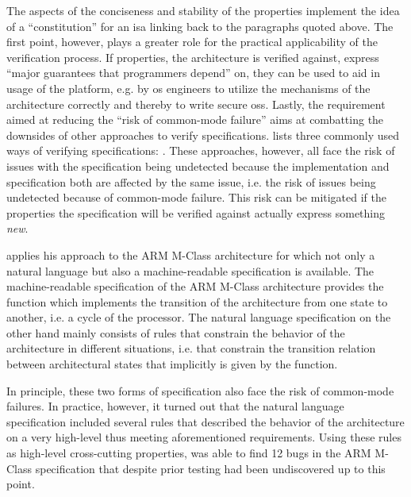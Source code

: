 The aspects of the conciseness and stability of the properties implement the idea of a \enquote{constitution} for an \gls{isa} linking back to the paragraphs quoted above.
The first point, however, plays a greater role for the practical applicability of the verification process.
If properties, the architecture is verified against, express \enquote{major guarantees that programmers  depend} on, they can be used to aid in usage of the platform, e.g. by \gls{os} engineers to utilize the mechanisms of the architecture correctly and thereby to write secure \glspl{os}.
Lastly, the requirement aimed at reducing the \enquote{risk of common-mode failure} aims at combatting the downsides of other approaches to verify specifications.
\citeauthor{Reid17} lists three commonly used ways of verifying specifications: .
These approaches, however, all face the risk of issues with the specification being undetected because the implementation and specification both are affected by the same issue, i.e. the risk of issues being undetected because of common-mode failure.
This risk can be mitigated if the properties the specification will be verified against actually express something \textit{new}.

\citeauthor{Reid17} applies his approach to the ARM M-Class architecture for which not only a natural language but also a machine-readable specification is available.
The machine-readable specification of the ARM M-Class architecture provides the function  which implements the transition of the architecture from one state to another, i.e. a cycle of the processor.
The natural language specification on the other hand mainly consists of rules that constrain the behavior of the architecture in different situations, i.e. that constrain the transition relation between architectural states that implicitly is given by the  function.

In principle, these two forms of specification also face the risk of common-mode failures.
In practice, however, it turned out that the natural language specification included several rules that described the behavior of the architecture on a very high-level thus meeting aforementioned requirements.
Using these rules as high-level cross-cutting properties, \citeauthor{Reid17} was able to find 12 bugs in the ARM M-Class specification that despite prior testing had been undiscovered up to this point.

